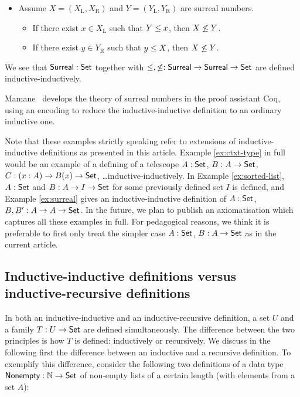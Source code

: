 \documentclass{schwicht}
\begin{document}
\begin{example}
\begin{itemize}
\item Assume $X = (X_\mathrm{L}, X_\mathrm{R})$ and $Y = (Y_\mathrm{L}, Y_\mathrm{R})$ are surreal numbers.
 \begin{itemize}
 \item If there exist $x \in X_\mathrm{L}$ such that $Y \leq x$, then $X \not\leq Y$.
 \item If there exist $y \in Y_\mathrm{R}$ such that $y \leq X$, then $X \not\leq Y$.
 \end{itemize}
\end{itemize}
We see that $\mathsf{Surreal} : \mathsf{Set}$ together with ${ \leq, \not\leq : \mathsf{Surreal}
  \to \mathsf{Surreal} \to \mathsf{Set}}$ are defined inductive-inductively.


Mamane~\cite{mamane2004surrealCoq} develops the theory of surreal
numbers in the proof assistant Coq, using an encoding to reduce the
inductive-inductive definition to an ordinary inductive one.
\blackqed
\end{example}

Note that these examples strictly speaking refer to extensions of
inductive-inductive definitions as presented in this article. Example
\ref{ex:ctxt-type} in full would be an example of a defining of a
telescope $A : \mathsf{Set}$, $B : A \to \mathsf{Set}$, $C : (x : A) \to B(x) \to
\mathsf{Set}$, \ldots inductive-inductively. In Example \ref{ex:sorted-list},
$A : \mathsf{Set}$ and $B : A \to I \to \mathsf{Set}$ for some previously defined set
$I$ is defined, and Example \ref{ex:surreal} gives an
inductive-inductive definition of $A : \mathsf{Set}$, $B, B' : A \to A \to
\mathsf{Set}$. In the future, we plan to publish an axiomatisation which
captures all these examples in full. For pedagogical reasons, we think
it is preferable to first only treat the simpler case $A : \mathsf{Set}$, $B :
A \to \mathsf{Set}$ as in the current article.

\subsection{Inductive-inductive definitions versus inductive-recursive definitions}
\label{sec:indind-vs-IR}


In both an inductive-inductive and an inductive-recursive definition,
a set $U$ and a family $T : U \to \mathsf{Set}$ are defined
simultaneously. The difference between the two principles is how $T$
is defined: inductively or recursively. We discuss in the following
first the difference between an inductive and a recursive definition.
To exemplify this difference, consider the following two definitions
of a data type $\mathsf{Nonempty} : \mathbb{N} \to \mathsf{Set}$ of non-empty lists of a
certain length (with elements from a set $A$):
\end{document}
